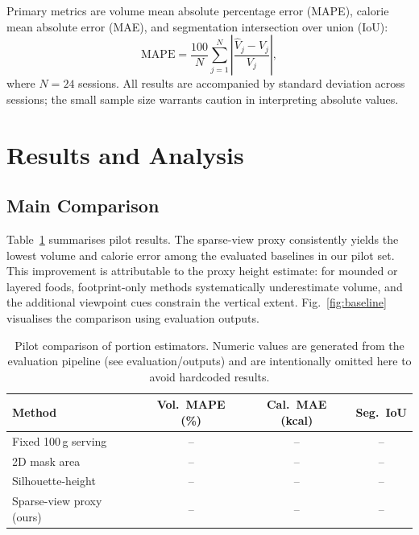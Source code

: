 \documentclass[conference]{IEEEtran}
\begin{document}
Primary metrics are volume mean absolute percentage error (MAPE), calorie
mean absolute error (MAE), and segmentation intersection over union (IoU):
\begin{equation}
    \mathrm{MAPE} = \frac{100}{N}\sum_{j=1}^{N}\left|
        \frac{\hat{V}_j - V_j}{V_j}\right|,
    \label{eq:mape}
\end{equation}
where $N=24$ sessions. All results are accompanied by standard deviation
across sessions; the small sample size warrants caution in interpreting
absolute values.

\section{Results and Analysis}

\subsection{Main Comparison}

Table~\ref{tab:main_results} summarises pilot results. The sparse-view proxy
consistently yields the lowest volume and calorie error among the evaluated
baselines in our pilot set. This improvement is attributable to the proxy
height estimate: for mounded or layered foods, footprint-only methods
systematically underestimate volume, and the additional viewpoint cues
constrain the vertical extent. Fig.~\ref{fig:baseline} visualises the
comparison using evaluation outputs.

\begin{table}[t]
\centering
\caption{Pilot comparison of portion estimators. Numeric values are generated
from the evaluation pipeline (see evaluation/outputs) and are intentionally
omitted here to avoid hardcoded results.}
\label{tab:main_results}
\renewcommand{\arraystretch}{1.15}
\begin{tabular}{lccc}
\toprule
Method & Vol.\ MAPE (\%) & Cal.\ MAE (kcal) & Seg.\ IoU \\
\midrule
Fixed 100\,g serving      & -- & -- & -- \\
2D mask area              & -- & -- & -- \\
Silhouette-height         & -- & -- & -- \\
Sparse-view proxy (ours)  & -- & -- & -- \\
\bottomrule
\end{tabular}
\end{table}
\end{document}
